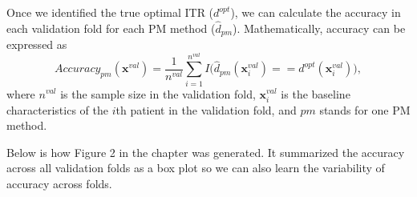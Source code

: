 \documentclass[
  letterpaper,
  DIV=11,
  numbers=noendperiod]{scrreprt}
\newenvironment{Shaded}{\begin{snugshade}}{\end{snugshade}}
\newcommand{\CommentTok}[1]{\textcolor[rgb]{0.37,0.37,0.37}{#1}}
\newcommand{\DecValTok}[1]{\textcolor[rgb]{0.68,0.00,0.00}{#1}}
\newcommand{\FunctionTok}[1]{\textcolor[rgb]{0.28,0.35,0.67}{#1}}
\newcommand{\NormalTok}[1]{\textcolor[rgb]{0.00,0.23,0.31}{#1}}
\newcommand{\OtherTok}[1]{\textcolor[rgb]{0.00,0.23,0.31}{#1}}
\newcommand{\SpecialCharTok}[1]{\textcolor[rgb]{0.37,0.37,0.37}{#1}}
\newcommand{\StringTok}[1]{\textcolor[rgb]{0.13,0.47,0.30}{#1}}
\begin{document}
\begin{Shaded}
\end{Shaded}

Once we identified the true optimal ITR (\(d^{opt}\)), we can calculate
the accuracy in each validation fold for each PM method
(\(\hat{d}_{pm}\)). Mathematically, accuracy can be expressed as
\[Accuracy_{pm}(\boldsymbol{x}^{val}) = \frac{1}{n^{val}}\sum_{i = 1}^{n^{val}} I\big(\hat{d}_{pm}(\boldsymbol{x}_i^{val}) == d^{opt}(\boldsymbol{x}_i^{val})\big),\]
where \(n^{val}\) is the sample size in the validation fold,
\(\boldsymbol{x}_i^{val}\) is the baseline characteristics of the
\(i\)th patient in the validation fold, and \(pm\) stands for one PM
method.

Below is how Figure 2 in the chapter was generated. It summarized the
accuracy across all validation folds as a box plot so we can also learn
the variability of accuracy across folds.
\end{document}
